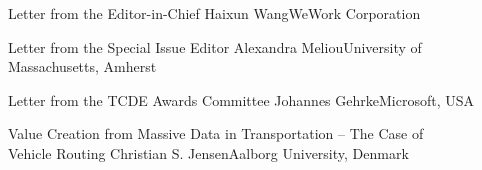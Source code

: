 \documentclass[11pt]{article}
\begin{document}


\begin{bulletin}


%
%

\begin{lettersection}


\begin{letter}{Letter from the Editor-in-Chief}
{Haixun Wang}{WeWork Corporation}

\end{letter}
%
\newpage
%

\begin{letter}{Letter from the Special Issue Editor}
{Alexandra Meliou}{University of Massachusetts, Amherst}

\end{letter}
\newpage
\begin{letter}{Letter from the TCDE Awards Committee}
{Johannes Gehrke}{Microsoft, USA}

\end{letter}

\end{lettersection}




\begin{opinionsection}
\begin{opinion}{Value Creation from Massive Data in Transportation -- The Case of\\ Vehicle Routing}
{Christian S. Jensen}{Aalborg University, Denmark}

\end{opinion}
\end{opinionsection}





\end{bulletin}
\end{document}
